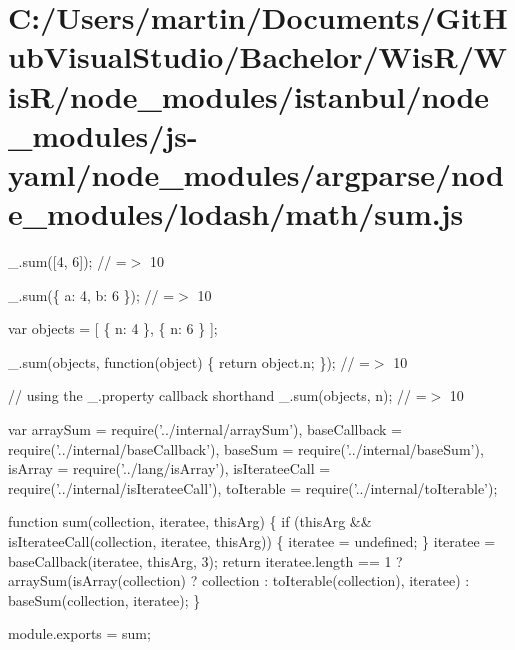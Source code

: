 \hypertarget{_c_1_2_users_2martin_2_documents_2_git_hub_visual_studio_2_bachelor_2_wis_r_2_wis_r_2node_moduledda18a5e35cc5b1cb1df48f396dc1d71}{}\section{C\+:/\+Users/martin/\+Documents/\+Git\+Hub\+Visual\+Studio/\+Bachelor/\+Wis\+R/\+Wis\+R/node\+\_\+modules/istanbul/node\+\_\+modules/js-\/yaml/node\+\_\+modules/argparse/node\+\_\+modules/lodash/math/sum.\+js}
\+\_\+.\+sum(\mbox{[}4, 6\mbox{]}); // =$>$ 10

\+\_\+.\+sum(\{ \textquotesingle{}a\textquotesingle{}\+: 4, \textquotesingle{}b\textquotesingle{}\+: 6 \}); // =$>$ 10

var objects = \mbox{[} \{ \textquotesingle{}n\textquotesingle{}\+: 4 \}, \{ \textquotesingle{}n\textquotesingle{}\+: 6 \} \mbox{]};

\+\_\+.\+sum(objects, function(object) \{ return object.\+n; \}); // =$>$ 10

// using the {\ttfamily \+\_\+.\+property} callback shorthand \+\_\+.\+sum(objects, \textquotesingle{}n\textquotesingle{}); // =$>$ 10


\begin{DoxyCodeInclude}
var arraySum = require(\textcolor{stringliteral}{'../internal/arraySum'}),
    baseCallback = require(\textcolor{stringliteral}{'../internal/baseCallback'}),
    baseSum = require(\textcolor{stringliteral}{'../internal/baseSum'}),
    isArray = require(\textcolor{stringliteral}{'../lang/isArray'}),
    isIterateeCall = require(\textcolor{stringliteral}{'../internal/isIterateeCall'}),
    toIterable = require(\textcolor{stringliteral}{'../internal/toIterable'});

\textcolor{keyword}{function} sum(collection, iteratee, thisArg) \{
  \textcolor{keywordflow}{if} (thisArg && isIterateeCall(collection, iteratee, thisArg)) \{
    iteratee = undefined;
  \}
  iteratee = baseCallback(iteratee, thisArg, 3);
  \textcolor{keywordflow}{return} iteratee.length == 1
    ? arraySum(isArray(collection) ? collection : toIterable(collection), iteratee)
    : baseSum(collection, iteratee);
\}

module.exports = sum;
\end{DoxyCodeInclude}
 